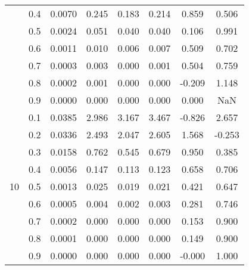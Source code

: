 \documentclass[11pt,a4paper]{report}
\begin{document}
\begin{longtable}{ | c | c || c | c | c | c | c | c | }
 & 0.4 & 0.0070 & 0.245 & 0.183 & 0.214 & 0.859 & 0.506 \\
 & 0.5 & 0.0024 & 0.051 & 0.040 & 0.040 & 0.106 & 0.991 \\
 & 0.6 & 0.0011 & 0.010 & 0.006 & 0.007 & 0.509 & 0.702 \\
 & 0.7 & 0.0003 & 0.003 & 0.000 & 0.001 & 0.504 & 0.759 \\
 & 0.8 & 0.0002 & 0.001 & 0.000 & 0.000 & -0.209 & 1.148 \\
 & 0.9 & 0.0000 & 0.000 & 0.000 & 0.000 & 0.000 & NaN \\
 \hline
\multirow{9}{*}{10} & 0.1 & 0.0385 & 2.986 & 3.167 & 3.467 & -0.826 & 2.657 \\
 & 0.2 & 0.0336 & 2.493 & 2.047 & 2.605 & 1.568 & -0.253 \\
 & 0.3 & 0.0158 & 0.762 & 0.545 & 0.679 & 0.950 & 0.385 \\
 & 0.4 & 0.0056 & 0.147 & 0.113 & 0.123 & 0.658 & 0.706 \\
 & 0.5 & 0.0013 & 0.025 & 0.019 & 0.021 & 0.421 & 0.647 \\
 & 0.6 & 0.0005 & 0.004 & 0.002 & 0.003 & 0.281 & 0.746 \\
 & 0.7 & 0.0002 & 0.000 & 0.000 & 0.000 & 0.153 & 0.900 \\
 & 0.8 & 0.0001 & 0.000 & 0.000 & 0.000 & 0.149 & 0.900 \\
 & 0.9 & 0.0000 & 0.000 & 0.000 & 0.000 & -0.000 & 1.000 \\
 \hline
\hline
\end{longtable}
\end{document}
